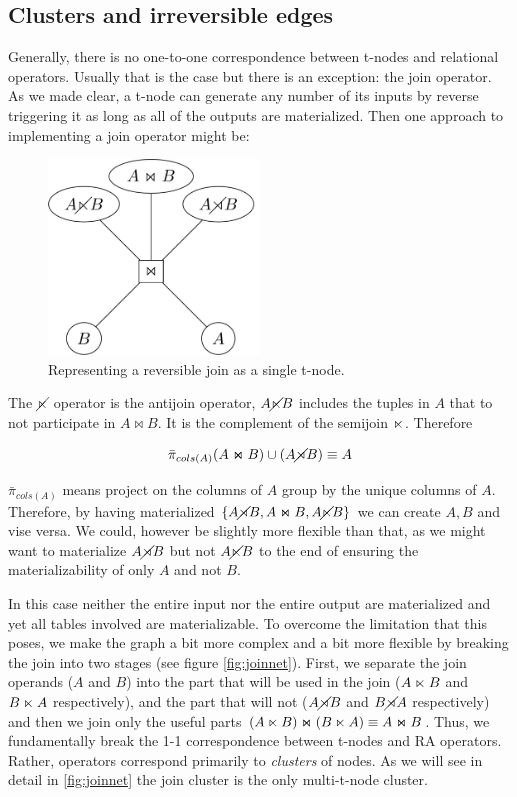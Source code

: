 \subsection{Clusters and irreversible edges}

Generally, there is no one-to-one correspondence between
t-nodes and relational operators. Usually that is the case but
there is an exception: the join operator. As we made clear, a t-node
can generate any number of its inputs by reverse triggering it as
long as all of the outputs are materialized. Then one approach to
implementing a join operator might be:

\begin{figure}[H]
  \centering
  \includegraphics[width=0.5\textwidth]{./imgs/naivejoinnet.pdf}
  \caption{\label{fig:org78bb458}Representing a reversible join as a single t-node.}
\end{figure}

The \(\cancel\ltimes\) operator is the antijoin operator, \(A \cancel\ltimes B\)
includes the tuples in \(A\) that to not participate in \(A \Join B\). It
is the complement of the semijoin \(\ltimes\). Therefore

\[ \bar{\pi}_{cols(A)}(A \Join B) \cup (A \cancel\rtimes B) \equiv A \]

\(\bar{\pi}_{cols(A)}\) means project on the columns of \(A\) group by
the unique columns of \(A\). Therefore, by having materialized \(\{A
\cancel\rtimes B, A \Join B, A \cancel\ltimes B\}\) we can create \({A,B}\) and vise
versa. We could, however be slightly more flexible than that, as we
might want to materialize \(A \cancel\rtimes B\) but not \(A \cancel\ltimes B\) to
the end of ensuring the materializability of only \(A\) and not
\(B\).

In this case neither the entire input nor the entire output are
materialized and yet all tables involved are materializable. To
overcome the limitation that this poses, we make the graph a bit more
complex and a bit more flexible by breaking the join into two stages
(see figure \ref{fig:joinnet}). First, we separate the join operands
(\(A\) and \(B\)) into the part that will be used in the join (\(A
\ltimes B\) and \(B \ltimes A\) respectively), and the part that will
not (\(A \cancel\rtimes B\) and \(B \cancel\rtimes A\) respectively) and then we
join only the useful parts \((A \ltimes B) \Join (B \ltimes A) \equiv A
\Join B\). Thus, we fundamentally break the 1-1 correspondence between
t-nodes and RA operators. Rather, operators correspond primarily to
\emph{clusters} of nodes. As we will see in detail in
\ref{fig:joinnet} the join cluster is the only multi-t-node cluster.

